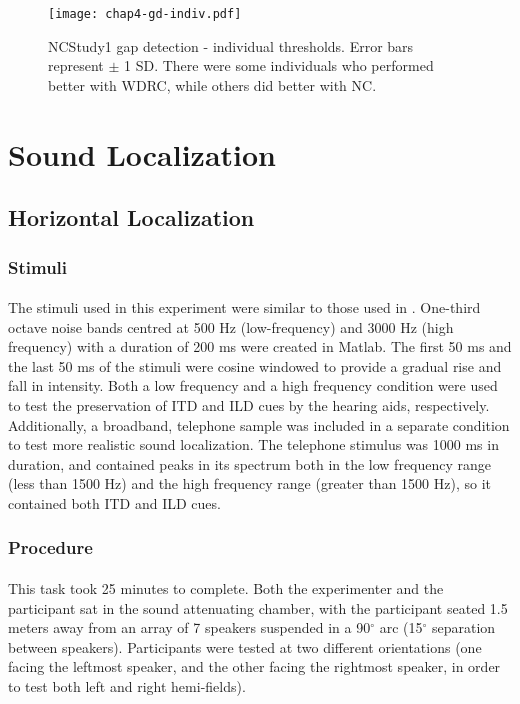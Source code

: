 \begin{figure}[htp]
\begin{center}
\texttt{[image: chap4-gd-indiv.pdf]} \\
\caption[NCStudy1 gap detection - individual thresholds]{NCStudy1 gap detection - individual thresholds.  Error bars represent $\pm$ 1 SD.  There were some individuals who performed better with WDRC, while others did better with NC.}
\label{ch4-gd-indiv}
\end{center}
\end{figure}

\section{Sound Localization}
\subsection{Horizontal Localization}
\subsubsection{Stimuli}
\paragraph{}The stimuli used in this experiment were similar to those used in .  One-third octave noise bands centred at 500 Hz (low-frequency) and 3000 Hz (high frequency) with a duration of 200 ms were created in Matlab.  The first 50 ms and the last 50 ms of the stimuli were cosine windowed to provide a gradual rise and fall in intensity.  Both a low frequency and a high frequency condition were used to test the preservation of ITD and ILD cues by the hearing aids, respectively.  Additionally, a broadband, telephone sample was included in a separate condition to test more realistic sound localization.  The telephone stimulus was 1000 ms in duration, and contained peaks in its spectrum both in the low frequency range (less than 1500 Hz) and the high frequency range (greater than 1500 Hz), so it contained both ITD and ILD cues.
\subsubsection{Procedure}
\paragraph{}This task took 25 minutes to complete.  Both the experimenter and the participant sat in the sound attenuating chamber, with the participant seated 1.5 meters away from an array of 7 speakers suspended in a 90$^\circ$ arc (15$^\circ$ separation between speakers).  Participants were tested at two different orientations (one facing the leftmost speaker, and the other facing the rightmost speaker, in order to test both left and right hemi-fields).

